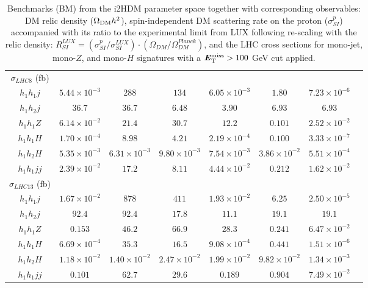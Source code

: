 \documentclass[12pt,a4paper]{article}
\newcommand{\MET}{\textbf{\textit{E}$_{\rm T}^{\rm miss}$}}
\begin{document}
\begin{table}[htb]
\begin{tabular}{|c||c|c|c|c|c|c|c|}
 \hline 
  $\sigma_{LHC8}$ (fb) &&&&&&\\
  ${h_1 h_1 j}$  		& $5.44\times 10^{-3}$ 	&  $288$  		& $134$  		& $6.05\times 10^{-3}$ 	&  $1.80$ 		&  $7.23\times 10^{-6}$ \\
  ${h_1 h_2 j}$  		& $36.7$      		&  $36.7$ 		& $6.48$  		& $3.90$ 		&  $6.93$ 		&  $6.93$ \\
  ${h_1h_1 Z}$  		& $6.14\times 10^{-2}$  &  $21.4$  		& $30.7$  		& $12.2$		&  $0.101$ 		&  $2.52\times 10^{-2}$ \\
  ${h_1h_1 H}$  		& $1.70\times 10^{-4}$  &  $8.98$  		& $4.21$  		& $2.19\times 10^{-4}$ 	&  $0.100$ 		&  $3.33\times 10^{-7}$ \\
  ${h_1h_2 H}$  		& $5.35\times 10^{-3}$  &  $6.31\times 10^{-3}$ & $9.80\times 10^{-3}$  & $7.54\times 10^{-3}$ 	&  $3.86\times 10^{-2}$ &  $5.51\times 10^{-4}$ \\
  ${h_1 h_1 jj}$		& $2.39\times 10^{-2}$	&  $17.2$  		& $8.11$  		& $4.44\times 10^{-2}$ 	&  $0.212$		&  $1.62\times 10^{-2}$ \\
 \hline 
  $\sigma_{LHC13}$ (fb) &&&&&&\\
  ${h_1 h_1 j}$  		& $1.67\times 10^{-2}$ 	&  $878$  		& $411$  		& $1.93\times 10^{-2}$ 	&  $6.25$ 		& $2.50\times 10^{-5} $ \\
  ${h_1 h_2 j}$  		& $92.4$      		&  $92.4$  		& $17.8$  		& $11.1$ 		&  $19.1$ 		&  $19.1$ \\
  ${h_1h_1 Z}$  		& $0.153$       	&  $46.2$  		& $66.9$  		& $28.3$ 		&  $0.241$ 		&  $6.47\times 10^{-2}$ \\
  ${h_1h_1 H}$  		& $6.69\times 10^{-4}$  &  $35.3$  		& $16.5$  		& $9.08\times 10^{-4}$ 	&  $0.441$ 		&  $1.51\times 10^{-6}$ \\
  ${h_1h_2 H}$  		& $1.18\times 10^{-2}$  &  $1.40\times 10^{-2}$ & $2.47\times 10^{-2}$  & $1.99\times 10^{-2}$ 	&  $9.82\times 10^{-2}$ &  $1.34\times 10^{-3}$ \\
  ${h_1 h_1 jj}$ 		& $0.101$	     	&  $62.7$  		& $29.6$  		& $0.189$ 		&  $0.904$ 		&  $7.49\times 10^{-2}$ \\
  \hline\hline
\end{tabular}
\caption{Benchmarks (BM) from the i2HDM parameter space
together with corresponding observables: DM relic density ($\Omega_{\rm DM} h^2$),
 spin-independent  DM scattering rate on the proton ($\sigma_{SI}^p$)
accompanied with its ratio to the experimental limit from LUX following re-scaling with the relic density: 
$R_{SI}^{LUX} =(\sigma_{SI}^p/\sigma_{SI}^{LUX})\cdot (\Omega_{DM}/\Omega_{DM}^{Planck})$,
and the LHC cross sections for mono-jet, mono-$Z$, and mono-$H$ signatures with a $\MET > 100$ GeV cut applied.
\label{tab:i2HDMbenchMarks}}
\end{table}
\end{document}
